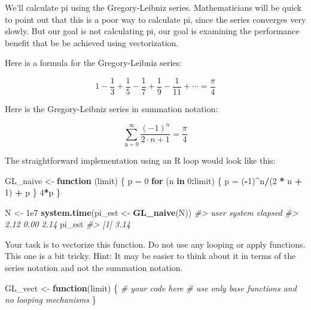 \documentclass[]{book}
\newenvironment{Shaded}{\begin{snugshade}}{\end{snugshade}}
\newcommand{\KeywordTok}[1]{\textcolor[rgb]{0.13,0.29,0.53}{\textbf{#1}}}
\newcommand{\DecValTok}[1]{\textcolor[rgb]{0.00,0.00,0.81}{#1}}
\newcommand{\FloatTok}[1]{\textcolor[rgb]{0.00,0.00,0.81}{#1}}
\newcommand{\StringTok}[1]{\textcolor[rgb]{0.31,0.60,0.02}{#1}}
\newcommand{\CommentTok}[1]{\textcolor[rgb]{0.56,0.35,0.01}{\textit{#1}}}
\newcommand{\ControlFlowTok}[1]{\textcolor[rgb]{0.13,0.29,0.53}{\textbf{#1}}}
\newcommand{\OperatorTok}[1]{\textcolor[rgb]{0.81,0.36,0.00}{\textbf{#1}}}
\newcommand{\NormalTok}[1]{#1}
\theoremstyle{definition}
\theoremstyle{definition}
\theoremstyle{definition}
\theoremstyle{remark}
\begin{document}
We'll calculate pi using the Gregory-Leibniz series. Mathematicians will
be quick to point out that this is a poor way to calculate pi, since the
series converges very slowly. But our goal is not calculating pi, our
goal is examining the performance benefit that be be achieved using
vectorization.

Here is a formula for the Gregory-Leibniz series:

\begin{equation}
1 - \frac{1}{3} + \frac{1}{5} - \frac{1}{7} + \frac{1}{9} - \frac{1}{11} + \cdots = \frac{\pi}{4}
\end{equation}

Here is the Gregory-Leibniz series in summation notation:

\begin{equation}
\sum_{\text{n}=0}^{\infty} \frac{(-1)^n}{2\cdot n + 1} = \frac{\pi}{4}
\end{equation}

The straightforward implementation using an R loop would look like this:

\begin{Shaded}
\begin{Highlighting}[]
\NormalTok{GL_naive <-}\StringTok{ }\ControlFlowTok{function}\NormalTok{ (limit) \{}
\NormalTok{  p =}\StringTok{ }\DecValTok{0}
  \ControlFlowTok{for}\NormalTok{ (n }\ControlFlowTok{in} \DecValTok{0}\OperatorTok{:}\NormalTok{limit) \{}
\NormalTok{    p =}\StringTok{ }\NormalTok{(}\OperatorTok{-}\DecValTok{1}\NormalTok{)}\OperatorTok{^}\NormalTok{n}\OperatorTok{/}\NormalTok{(}\DecValTok{2} \OperatorTok{*}\StringTok{ }\NormalTok{n }\OperatorTok{+}\StringTok{ }\DecValTok{1}\NormalTok{) }\OperatorTok{+}\StringTok{ }\NormalTok{p}
\NormalTok{    \}}
  \DecValTok{4}\OperatorTok{*}\NormalTok{p}
\NormalTok{\}}

\NormalTok{N <-}\StringTok{ }\FloatTok{1e7}
\KeywordTok{system.time}\NormalTok{(pi_est <-}\StringTok{ }\KeywordTok{GL_naive}\NormalTok{(N))}
\CommentTok{#>    user  system elapsed }
\CommentTok{#>    2.12    0.00    2.14}
\NormalTok{pi_est}
\CommentTok{#> [1] 3.14}
\end{Highlighting}
\end{Shaded}

Your task is to vectorize this function. Do not use any looping or apply
functions. This one is a bit tricky. Hint: It may be easier to think
about it in terms of the series notation and not the summation notation.

\begin{Shaded}
\begin{Highlighting}[]
\NormalTok{GL_vect <-}\StringTok{ }\ControlFlowTok{function}\NormalTok{(limit) \{}
  \CommentTok{# your code here}
  \CommentTok{# use only base functions and no looping mechanisms}
\NormalTok{\}}
\end{Highlighting}
\end{Shaded}
\end{document}
